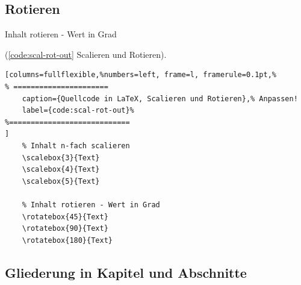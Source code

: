 
\subsection{Rotieren}

Inhalt rotieren - Wert in Grad

\vspace{10mm}



(\autoref{code:scal-rot-out} Scalieren und Rotieren).
\lstset{language=[LaTeX]TeX} %
\begin{lstlisting}[columns=fullflexible,%numbers=left, frame=l, framerule=0.1pt,%
% ======================
	caption={Quellcode in LaTeX, Scalieren und Rotieren},% Anpassen!
	label={code:scal-rot-out}%
%============================
]
	% Inhalt n-fach scalieren
	\scalebox{3}{Text}
	\scalebox{4}{Text}
	\scalebox{5}{Text}

	% Inhalt rotieren - Wert in Grad
	\rotatebox{45}{Text}
	\rotatebox{90}{Text}
	\rotatebox{180}{Text}
\end{lstlisting}

\newpage

\subsection{Gliederung in Kapitel und Abschnitte}\label{sec:Gliederung-Kapitel-Abschnitte}

